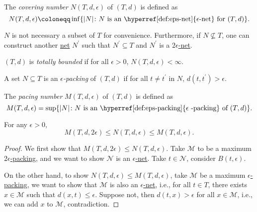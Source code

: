 \begin{definition}\label{def:covering-number}
  The \emph{covering number} \(N(T, d, \epsilon )\) of \((T, d)\) is defined as
  \[
    N(T, d, \epsilon ) \coloneqq \inf \{ \vert N \vert \colon N \text{ is an \hyperref[def:eps-net]{\(\epsilon\)-net} for \((T, d)\)} \}.
  \]
\end{definition}

\begin{remark}
  \(N\) is not necessary a subset of \(T\) for convenience. Furthermore, if \(N \nsubseteq T\), one can construct another \hyperref[def:eps-net]{net} \(N^{\prime} \) such that \(N^{\prime} \subseteq T\) and \(N^{\prime} \) is a \hyperref[def:eps-net]{\(2 \epsilon\)-net}.
\end{remark}

\begin{definition}\label{def:totally-bounded}
  \((T, d)\) is \emph{totally bounded} if for all \(\epsilon > 0\), \(N(T, d, \epsilon ) < \infty \).
\end{definition}

\begin{definition}\label{def:eps-packing}
  A set \(N \subseteq T\) is an \emph{\(\epsilon \)-packing} of \((T, d)\) if for all \(t \neq t^{\prime} \) in \(N\), \(d(t, t^{\prime} ) > \epsilon \).
\end{definition}

\begin{definition}\label{def:packing-number}
  The \emph{pacing number} \(M(T, d, \epsilon )\) of \((T, d)\) is defined as
  \[
    M(T, d, \epsilon ) = \sup \{ \vert N \vert \colon N \text{ is an \hyperref[def:eps-packing]{\(\epsilon\) -packing} of \((T, d)\)}\}.
  \]
\end{definition}

\begin{lemma}\label{lma:lec10}
  For any \(\epsilon > 0\),
  \[
    M(T, d, 2\epsilon ) \leq N(T, d, \epsilon ) \leq M(T, d, \epsilon ).
  \]
\end{lemma}
\begin{proof}
  We first show that \(M(T, d, 2\epsilon ) \leq N(T, d, \epsilon )\). Take \(\mathcal{M} \) to be a maximum \hyperref[def:eps-packing]{\(2\epsilon\)-packing}, and we want to show \(\mathcal{N} \) is an \hyperref[def:eps-net]{\(\epsilon\)-net}. Take \(t\in \mathcal{N} \), consider \(B(t, \epsilon )\).

  On the other hand, to show \(N(T, d, \epsilon ) \leq M(T, d, \epsilon )\), take \(\mathcal{M} \) be a maximum \hyperref[def:eps-packing]{\(\epsilon\)-packing}, we want to show that \(\mathcal{M} \) is also an \hyperref[def:eps-net]{\(\epsilon\)-net}, i.e., for all \(t\in T\), there exists \(x\in \mathcal{M} \) such that \(d(x, t) \leq \epsilon \). Suppose not, then \(d(t, x) > \epsilon \) for all \(x\in \mathcal{M} \), i.e., we can add \(x\) to \(\mathcal{M} \), contradiction.
\end{proof}

